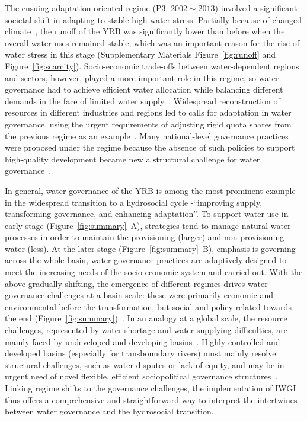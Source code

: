 \documentclass[draft]{../agujournal2019}
\begin{document}
The ensuing adaptation-oriented regime (P3: $2002 \sim 2013$) involved a significant societal shift in adapting to stable high water stress.
Partially because of changed climate~\cite{han2023,liu2020c}, the runoff of the YRB was significantly lower than before when the overall water uses remained stable, which was an important reason for the rise of water stress in this stage (Supplementary Materials Figure~\ref{fig:runoff} and Figure~\ref{fig:scarcity}).
Socio-economic trade-offs between water-dependent regions and sectors, however, played a more important role in this regime, so water governance had to achieve efficient water allocation while balancing different demands in the face of limited water supply~\cite{dalin2015,song2022}.
Widespread reconstruction of resources in different industries and regions led to calls for adaptation in water governance, using the urgent requirements of adjusting rigid quota shares from the previous regime as an example~\cite{wang2019e}.
Many national-level governance practices were proposed under the regime because the absence of such policies to support high-quality development became new a structural challenge for water governance~\cite{konar2019}.

In general, water governance of the YRB is among the most prominent example in the widespread transition to a hydrosocial cycle -``improving supply, transforming governance, and enhancing adaptation''.
To support water use in early stage (Figure~\ref{fig:summary}~A), strategies tend to manage natural water processes in order to maintain the provisioning (larger) and non-provisioning water (less).
At the later stage (Figure~\ref{fig:summary}~B), emphasis is governing across the whole basin, water governance practices are adaptively designed to meet the increasing needs of the socio-economic system and carried out.
With the above gradually shifting, the emergence of different regimes drives water governance challenges at a basin-scale: these were primarily economic and environmental before the transformation, but social and policy-related towards the end (Figure~\ref{fig:summary})~\cite{singh2019,porcher2019}.
In an analogy at a global scale, the resource challenges, represented by water shortage and water supplying difficulties, are mainly faced by undeveloped and developing basins~\cite{allan2019,speed2013,liu2012}.
Highly-controlled and developed basins (especially for transboundary rivers) must mainly resolve structural challenges, such as water disputes or lack of equity, and may be in urgent need of novel flexible, efficient sociopolitical governance structures~\cite{unep-dhi2016,mirumachi2015}.
Linking regime shifts to the governance challenges, the implementation of IWGI thus offers a comprehensive and straightforward way to interpret the intertwines between water governance and the hydrosocial transition.
\end{document}
